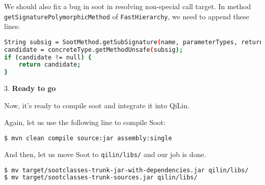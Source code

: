 \documentclass[11pt]{article}
\begin{document}
We should also fix a bug in soot in resolving non-special call target.
In method \texttt{getSignaturePolymorphicMethod} of \texttt{FastHierarchy}, we need to append these lines:
\begin{lstlisting}[language=bash, frame=single,]
String subsig = SootMethod.getSubSignature(name, parameterTypes, returnType);
candidate = concreteType.getMethodUnsafe(subsig);
if (candidate != null) {
	return candidate;
}
\end{lstlisting}


3. \textbf{Ready to go}

Now, it's ready to compile soot and integrate it into QiLin.

Again, let us use the following line to compile Soot:
\begin{lstlisting}[language=bash, backgroundcolor = \color{lightgray},]
$ mvn clean compile source:jar assembly:single
\end{lstlisting}
And then, let us move Soot to \texttt{qilin/libs/} and our job is done.
\begin{lstlisting}[language=bash, backgroundcolor = \color{lightgray},]
$ mv target/sootclasses-trunk-jar-with-dependencies.jar qilin/libs/
$ mv target/sootclasses-trunk-sources.jar qilin/libs/
\end{lstlisting}
\end{document}
